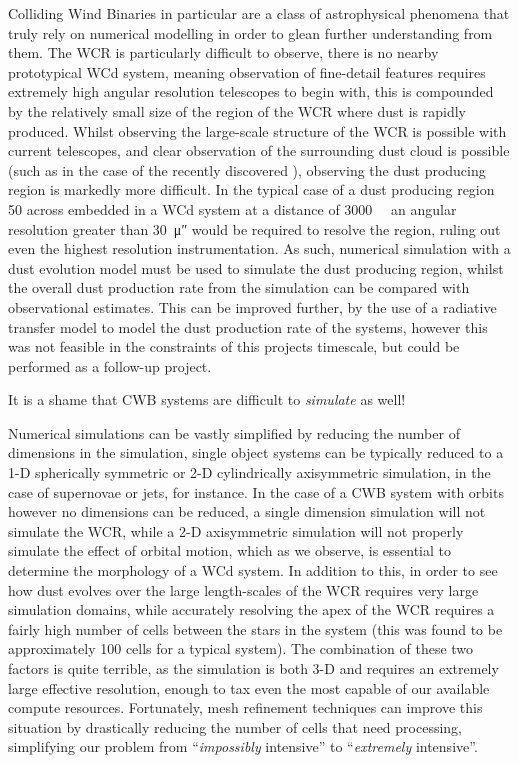 Colliding Wind Binaries in particular are a class of astrophysical phenomena that truly rely on numerical modelling in order to glean further understanding from them.
The WCR is particularly difficult to observe, there is no nearby prototypical WCd system, meaning observation of fine-detail features requires extremely high angular resolution telescopes to begin with, this is compounded by the relatively small size of the region of the WCR where dust is rapidly produced.
Whilst observing the large-scale structure of the WCR is possible with current telescopes, and clear observation of the surrounding dust cloud is possible (such as in the case of the recently discovered \textcite{callinghamAnisotropicWindsWolf2019}), observing the dust producing region is markedly more difficult.
In the typical case of a dust producing region \SI{50}{\au} across embedded in a WCd system at a distance of \SI{3000}{\kilo\pc} an angular resolution greater than \SI{30}{\micro\arcsecond} would be required to resolve the region, ruling out even the highest resolution instrumentation.
As such, numerical simulation with a dust evolution model must be used to simulate the dust producing region, whilst the overall dust production rate from the simulation can be compared with observational estimates.
This can be improved further, by the use of a radiative transfer model to model the dust production rate of the systems, however this was not feasible in the constraints of this projects timescale, but could be performed as a follow-up project.


It is a shame that CWB systems are difficult to \textit{simulate} as well!

Numerical simulations can be vastly simplified by reducing the number of dimensions in the simulation, single object systems can be typically reduced to a 1-D spherically symmetric or 2-D cylindrically axisymmetric simulation, in the case of supernovae or jets, for instance.
In the case of a CWB system with orbits however no dimensions can be reduced, a single dimension simulation will not simulate the WCR, while a 2-D axisymmetric simulation will not properly simulate the effect of orbital motion, which as we observe, is essential to determine the morphology of a WCd system.
In addition to this, in order to see how dust evolves over the large length-scales of the WCR requires very large simulation domains, while accurately resolving the apex of the WCR requires a fairly high number of cells between the stars in the system (this was found to be approximately 100 cells for a typical system).
The combination of these two factors is quite terrible, as the simulation is both 3-D and requires an extremely large effective resolution, enough to tax even the most capable of our available compute resources.
Fortunately, mesh refinement techniques can improve this situation by drastically reducing the number of cells that need processing, simplifying our problem from ``\textit{impossibly} intensive'' to ``\textit{extremely} intensive''.

